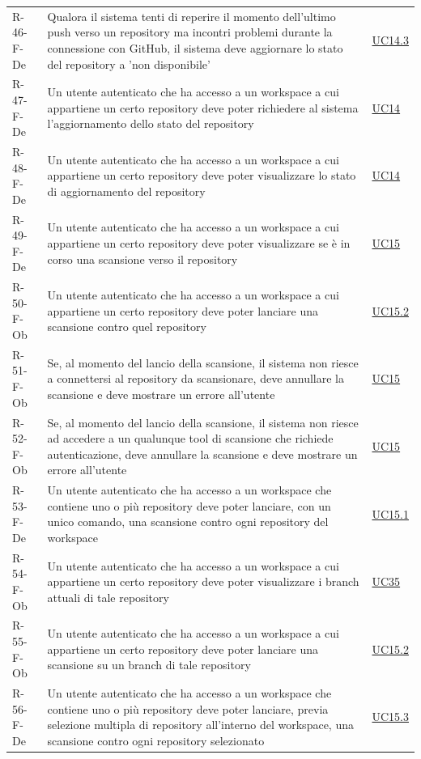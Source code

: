 \documentclass[a4paper, 11pt]{article}
\begin{document}
\begin{longtable}[c]{ >{\centering\arraybackslash}m{2.5cm} >{\centering\arraybackslash}m{8.3cm} >{\centering\arraybackslash}m{3.5cm} }
    R-46-F-De & Qualora il sistema tenti di reperire il momento dell'ultimo push verso un repository ma incontri problemi durante la connessione con GitHub, il sistema deve aggiornare lo stato del repository a 'non disponibile' & \hyperref[UC14.3]{UC14.3}\\
    R-47-F-De & Un utente autenticato che ha accesso a un workspace a cui appartiene un certo repository deve poter richiedere al sistema l'aggiornamento dello stato del repository & \hyperref[UC14]{UC14}\\
    R-48-F-De & Un utente autenticato che ha accesso a un workspace a cui appartiene un certo repository deve poter visualizzare lo stato di aggiornamento del repository & \hyperref[UC14]{UC14}\\
    R-49-F-De & Un utente autenticato che ha accesso a un workspace a cui appartiene un certo repository deve poter visualizzare se è in corso una scansione verso il repository & \hyperref[UC15]{UC15}\\
    R-50-F-Ob & Un utente autenticato che ha accesso a un workspace a cui appartiene un certo repository deve poter lanciare una scansione contro quel repository & \hyperref[UC15.2]{UC15.2}\\
    R-51-F-Ob & Se, al momento del lancio della scansione, il sistema non riesce a connettersi al repository da scansionare, deve annullare la scansione e deve mostrare un errore all'utente & \hyperref[UC15]{UC15}\\
    R-52-F-Ob & Se, al momento del lancio della scansione, il sistema non riesce ad accedere a un qualunque tool di scansione che richiede autenticazione, deve annullare la scansione e deve mostrare un errore all'utente & \hyperref[UC15]{UC15}\\
    R-53-F-De & Un utente autenticato che ha accesso a un workspace che contiene uno o più repository deve poter lanciare, con un unico comando, una scansione contro ogni repository del workspace & \hyperref[UC15.1]{UC15.1}\\
    R-54-F-Ob & Un utente autenticato che ha accesso a un workspace a cui appartiene un certo repository deve poter visualizzare i branch attuali di tale repository & \hyperref[UC35]{UC35}\\
    R-55-F-Ob & Un utente autenticato che ha accesso a un workspace a cui appartiene un certo repository deve poter lanciare una scansione su un branch di tale repository & \hyperref[UC15.2]{UC15.2}\\
    R-56-F-De & Un utente autenticato che ha accesso a un workspace che contiene uno o più repository deve poter lanciare, previa selezione multipla di repository all'interno del workspace, una scansione contro ogni repository selezionato & \hyperref[UC15.3]{UC15.3}\\

\end{longtable}
\end{document}
